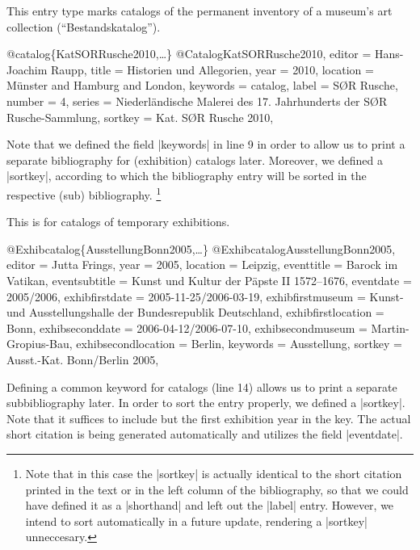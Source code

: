 \documentclass[a4paper,
10pt,
ngerman,
english
]{ltxdoc}
\begin{document}
This entry type marks catalogs of the permanent inventory of a museum's art collection (\enquote{Bestandskatalog}).
\begin{bibexample}[label=KatSORRusche2010]{{@}catalog\{KatSORRusche2010,…\}}
@Catalog{KatSORRusche2010,
  editor   = {Hans-Joachim Raupp},
  title    = {Historien und Allegorien},
  year     = {2010},
  location = {Münster and Hamburg and London},
  keywords = {catalog},
  label    = {S{{\O}}R Rusche},
  number   = {4},
  series   = {Niederländische Malerei des 17. Jahrhunderts der S{{\O}}R Rusche-Sammlung},
  sortkey  = {Kat. S{{\O}}R Rusche 2010},
}
\end{bibexample}
Note that we defined the field |keywords| in line 9 in order to allow us to print a separate bibliography for (exhibition) catalogs later.
Moreover, we defined a |sortkey|, according to which the bibliography entry will be sorted in the respective (sub) bibliography.%
\footnote{Note that in this case the |sortkey| is actually identical to the short citation printed in the text or in the left column of the bibliography, so that we could have defined it as a |shorthand| and left out the |label| entry. However, we intend to sort automatically in a future update, rendering a |sortkey| unneccesary.}

This is for catalogs of temporary exhibitions.
\begin{bibexample}[label=AusstellungBonn2005]{{@}Exhibcatalog\{AusstellungBonn2005,…\}}
@Exhibcatalog{AusstellungBonn2005,
  editor          = {Jutta Frings},
  year            = {2005},
  location        = {Leipzig},
  eventtitle      = {Barock im Vatikan},
  eventsubtitle   = {Kunst und Kultur der Päpste II 1572--1676},
  eventdate       = {2005/2006},
  exhibfirstdate  = {2005-11-25/2006-03-19},
  exhibfirstmuseum = {Kunst- und Ausstellungshalle der Bundesrepublik Deutschland},
  exhibfirstlocation = {Bonn},
  exhibseconddate = {2006-04-12/2006-07-10},
  exhibsecondmuseum = {Martin-Gropius-Bau},
  exhibsecondlocation = {Berlin},
  keywords        = {Ausstellung},
  sortkey         = {Ausst.-Kat. Bonn/Berlin 2005},
}
\end{bibexample}
Defining a common keyword for catalogs (line 14) allows us to print a separate subbibliography later. In order to sort the entry properly, we defined a |sortkey|. Note that it suffices to include but the first exhibition year in the key. The actual short citation is being generated automatically and utilizes the field |eventdate|.
\end{document}
